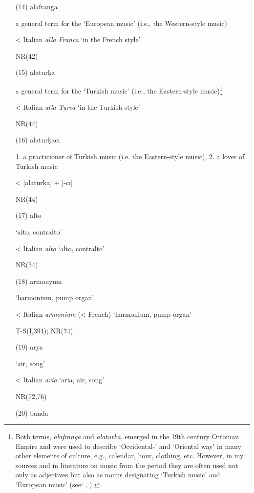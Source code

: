 \documentclass[output=paper,colorlinks,citecolor=brown,arabicfont,chinesefont]{langscibook}
\begin{document}
\begin{itemize}
    \item[(14)] alafranġa  {}

    a general term for the ‘European music’ (i.e., the Western-style music)

    < Italian \emph{alla Franca} ‘in the French style’

    NR(42)
    \item[(15)] alaturḳa {}

    a general term for the ‘Turkish music’ (i.e., the Eastern-style music)\footnote{Both terms, \emph{alafranga} and \emph{alaturka}, emerged in the 19th century Ottoman Empire and were used to describe ‘Occidental-’ and ‘Oriental way’ in many other elements of culture, e.g., calendar, hour, clothing, etc. However, in my sources and in literature on music from the period they are often used not only as adjectives but also as nouns designating ‘Turkish music’ and ‘European music’ (see: \citealt[10]{Ozalp2000}, \citealt[2--27]{Oztuna1969}).}

    < Italian \emph{alla Turca} ‘in the Turkish style’

    NR(44)
    \item[(16)] alaturḳacı {}

    1. a practicioner of Turkish music (i.e. the Eastern-style music), 2. a lover of Turkish music

    < {} [alaturḳa] + {} [-cı]

    NR(44)
    \item[(17)] alto {}

    ‘alto, contralto’

    < Italian \emph{alto} ‘alto, contralto’

    NR(54)
    \item[(18)] armonyum {}

    ‘harmonium, pump organ’

    < Italian \emph{armonium} (< French) ‘harmonium, pump organ’

    T-S(I,394); NR(74) 
    \item[(19)] arya {}

    ‘air, song’

    < Italian \emph{aria} ‘aria, air, song’

    NR(72,76)
    \item[(20)] banda {}


\end{itemize}
\end{document}
